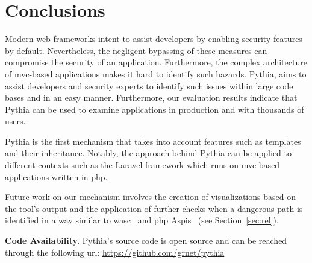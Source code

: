 \vspace{-2mm}

\section{Conclusions}
\label{sec:conc}

Modern web frameworks intent to
assist developers by enabling
security features by default.
Nevertheless,
the negligent bypassing of these
measures can compromise 
the security of an application.
Furthermore,
the complex architecture of
{\sc mvc}-based applications
makes it hard to identify such hazards.
Pythia,
aims to assist developers and
security experts to identify
such issues within large code bases
and in an easy manner.
Furthermore,
our evaluation results indicate
that Pythia can be used to examine
applications in production and with
thousands of users.

Pythia is the first mechanism
that takes into account features
such as templates and their inheritance.
Notably,
the approach behind Pythia can be
applied to different contexts
such as the Laravel framework which
runs on {\sc mvc}-based applications
written in {\sc php}.

Future work on our mechanism
involves the creation of visualizations
based on the tool's output and the
application of further checks
when a dangerous path is identified
in a way similar to
{\sc wasc}~\cite{NLC07} and
{\sc php} Aspis~\cite{PMP11}
(see Section~\ref{sec:rel}).\\

\vspace{-2mm}

\noindent
{\bf Code Availability.}
Pythia's source code is open source and
can be reached through the
following {\sc url}:
\url{https://github.com/grnet/pythia}

\vspace{1mm}
